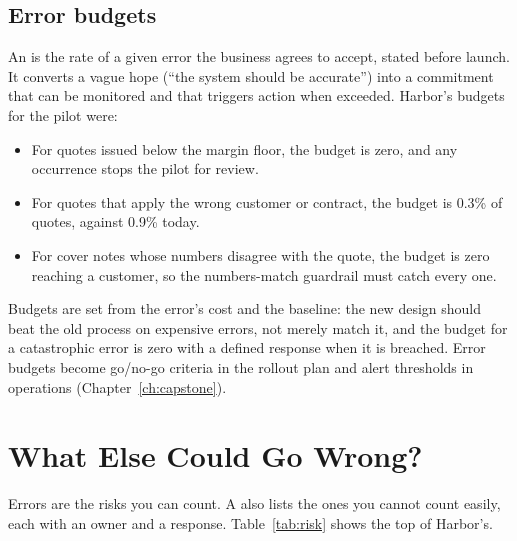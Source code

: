 \subsection{Error budgets}

An  is the rate of a given error the business agrees to accept, stated before launch. It converts a vague hope (``the system should be accurate'') into a commitment that can be monitored and that triggers action when exceeded. Harbor's budgets for the pilot were:
\begin{itemize}[itemsep=1pt]
  \item For quotes issued below the margin floor, the budget is zero, and any occurrence stops the pilot for review.
  \item For quotes that apply the wrong customer or contract, the budget is 0.3\% of quotes, against 0.9\% today.
  \item For cover notes whose numbers disagree with the quote, the budget is zero reaching a customer, so the numbers-match guardrail must catch every one.
\end{itemize}
Budgets are set from the error's cost and the baseline: the new design should beat the old process on expensive errors, not merely match it, and the budget for a catastrophic error is zero with a defined response when it is breached. Error budgets become go/no-go criteria in the rollout plan and alert thresholds in operations (Chapter~\ref{ch:capstone}).

\section{What Else Could Go Wrong?}
\label{sec:risk}

Errors are the risks you can count. A  also lists the ones you cannot count easily, each with an owner and a response. Table~\ref{tab:risk} shows the top of Harbor's.

